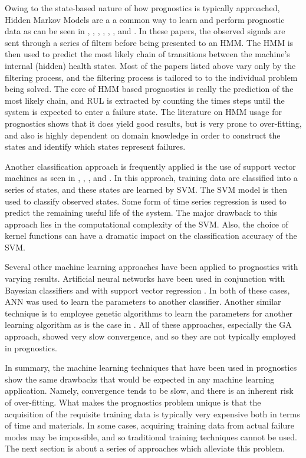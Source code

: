 \documentclass[12pt]{article}
\begin{document}
Owing to the state-based nature of how prognostics is typically approached,
Hidden Markov Models are a a common way to learn and perform prognostic data as
can be seen in \cite{6246315}, \cite{6190767}, \cite{6023116}, \cite{6228954},
\cite{5414580}, \cite{5262871}, and \cite{1241660}. In these papers, the
observed signals are sent through a series of filters before being presented to
an HMM. The HMM is then used to predict the most likely chain of transitions
between the machine’s internal (hidden) health states.  Most of the papers
listed above vary only by the filtering process, and the filtering process is
tailored to to the individual problem being solved. The core of HMM based
prognostics is really the prediction of the most likely chain, and RUL is
extracted by counting the times steps until the system is expected to enter a
failure state. The literature on HMM usage for prognostics shows that it does
yield good results, but is very prone to over-fitting, and also is highly
dependent on domain knowledge in order to construct the states and identify
which states represent failures.

Another classification approach is frequently applied is the use of support
vector machines as seen in \cite{6299511}, \cite{6299512}, \cite{6228843}, and
\cite{5939470}.  In this approach, training data are classified into a series
of states, and these states are learned by SVM.  The SVM model is then used to
classify observed states.  Some form of time series regression is used to
predict the remaining useful life of the system.  The major drawback to this
approach lies in the computational complexity of the SVM.  Also, the choice of
kernel functions can have a dramatic impact on the classification accuracy of
the SVM.  

Several other machine learning approaches have been applied to prognostics with
varying results.  Artificial neural networks have been used in conjunction with
Bayesian classifiers \cite{4350749} and with support vector regression
\cite{5939530}.  In both of these cases, ANN was used to learn the parameters
to another classifier.  Another similar technique is to employee genetic
algorithms to learn the parameters for another learning algorithm as is the
case in \cite{4350749}.  All of these approaches, especially the GA approach,
showed very slow convergence, and so they are not typically employed in
prognostics.  

In summary, the machine learning techniques that have been used in prognostics
show the same drawbacks that would be expected in any machine learning
application.  Namely, convergence tends to be slow, and there is an inherent
risk of over-fitting.  What makes the prognostics problem unique is that the
acquisition of the requisite training data is typically very expensive both in
terms of time and materials.  In some cases, acquiring training data from
actual failure modes may be impossible, and so traditional training techniques
cannot be used.  The next section is about a series of approaches which
alleviate this problem.
\end{document}
